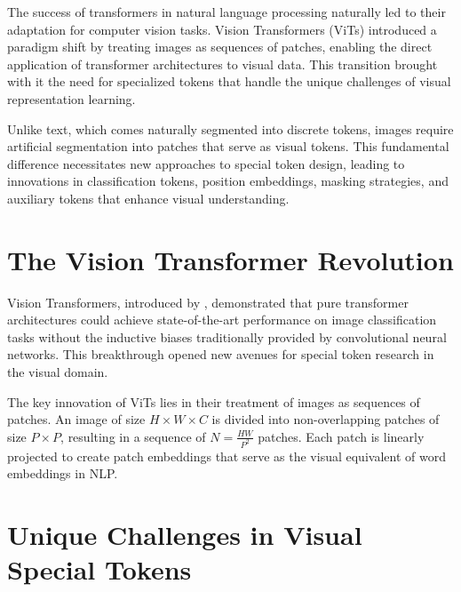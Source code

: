 
The success of transformers in natural language processing naturally led to their adaptation for computer vision tasks. Vision Transformers (ViTs) introduced a paradigm shift by treating images as sequences of patches, enabling the direct application of transformer architectures to visual data. This transition brought with it the need for specialized tokens that handle the unique challenges of visual representation learning.
\begin{comment}
Feedback: This is a strong start. To make the core challenge more vivid, you could add a sentence like: "This chapter explores how the discrete, symbolic world of language tokens was translated into the continuous, spatial domain of images, a translation that required both clever adaptations of old ideas and the invention of entirely new ones."
\end{comment}

Unlike text, which comes naturally segmented into discrete tokens, images require artificial segmentation into patches that serve as visual tokens. This fundamental difference necessitates new approaches to special token design, leading to innovations in classification tokens, position embeddings, masking strategies, and auxiliary tokens that enhance visual understanding.

\section{The Vision Transformer Revolution}

Vision Transformers, introduced by \citet{dosovitskiy2020image}, demonstrated that pure transformer architectures could achieve state-of-the-art performance on image classification tasks without the inductive biases traditionally provided by convolutional neural networks. This breakthrough opened new avenues for special token research in the visual domain.

The key innovation of ViTs lies in their treatment of images as sequences of patches. An image of size $H \times W \times C$ is divided into non-overlapping patches of size $P \times P$, resulting in a sequence of $N = \frac{HW}{P^2}$ patches. Each patch is linearly projected to create patch embeddings that serve as the visual equivalent of word embeddings in NLP.

\section{Unique Challenges in Visual Special Tokens}

